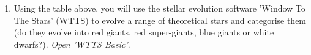 \documentclass{article}
\newenvironment{white}{\color{white}}{\ignorespacesafterend}
\begin{document}
    
    \begin{tcolorbox}[enhanced,attach boxed title to top center={yshift=-3mm,yshifttext=-1mm},colback=purple!90!white,colframe=purple!80!white,colbacktitle=purple!80!black,title=Research Project - The Red Giant Branch,fonttitle=\bfseries,boxed title style={size=small,colframe=purple!80!black}]
        \begin{bfseries}
        \begin{white}
            \begin{enumerate}
                \item Using the table above, you will use the stellar evolution software 'Window To The Stars' (WTTS) to evolve a range of theoretical stars and categorise them (do they evolve into red giants, red super-giants, blue giants or white dwarfs?). \emph{Open 'WTTS Basic'}.
            \end{enumerate}
        \end{white}
        \end{bfseries}
    \end{tcolorbox}
    



\newpage



\end{document}
